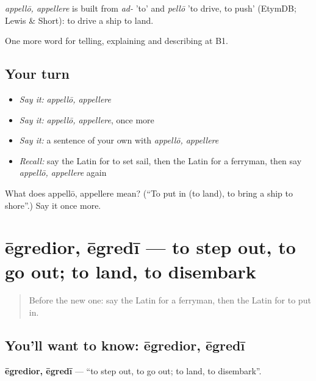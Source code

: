 \begin{cousinweb}
\emph{appellō, appellere} is built from \emph{ad-} 'to' and \emph{pellō} 'to drive, to push' (EtymDB; Lewis \& Short): to drive a ship to land.
\end{cousinweb}

\begin{grammarlens}[title={What you've built}]
One more word for telling, explaining and describing at B1.
\end{grammarlens}

\subsection*{Your turn}
\begin{itemize}
\raggedright
  \item \emph{Say it:} \emph{appellō, appellere}
  \item \emph{Say it:} \emph{appellō, appellere}, once more
  \item \emph{Say it:} a sentence of your own with \emph{appellō, appellere}
  \item \emph{Recall:} say the Latin for to set sail, then the Latin for a ferryman, then say \emph{appellō, appellere} again
\end{itemize}

\begin{tcolorbox}[breakable,colback=teal!4,colframe=teal!35!black,title={Before you move on}]
What does appellō, appellere mean? (\textquotedblleft{}To put in (to land), to bring a ship to shore\textquotedblright{}.) Say it once more.
\end{tcolorbox}
\section[ēgredior, ēgredī]{ēgredior, ēgredī — to step out, to go out; to land, to disembark}

\label{lesson:LA-C439-egredior}



\begin{quote}
Before the new one: say the Latin for a ferryman, then the Latin for to put in.
\end{quote}

\subsection*{You'll want to know: ēgredior, ēgredī}
\textbf{ēgredior, ēgredī} — \textquotedblleft{}to step out, to go out; to land, to disembark\textquotedblright{}.

